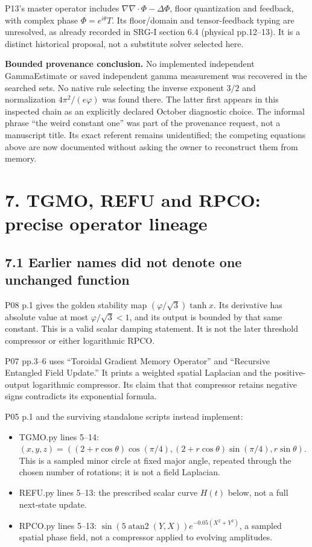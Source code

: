 \documentclass[11pt,a4paper]{article}
\begin{document}
P13's master operator includes $\nabla\nabla\cdot\Phi-\Delta\Phi$, floor quantization and feedback, with complex phase $\Phi=e^{i\theta}T$. Its floor/domain and tensor-feedback typing are unresolved, as already recorded in SRG-I section 6.4 (physical pp.12--13). It is a distinct historical proposal, not a substitute solver selected here.


\textbf{Bounded provenance conclusion.} No implemented independent GammaEstimate or saved independent gamma measurement was recovered in the searched sets. No native rule selecting the inverse exponent $3/2$ and normalization $4\pi^2/(e\varphi)$ was found there. The latter first appears in this inspected chain as an explicitly declared October diagnostic choice. The informal phrase ``the weird constant one'' was part of the provenance request, not a manuscript title. Its exact referent remains unidentified; the competing equations above are now documented without asking the owner to reconstruct them from memory.


\clearpage
\section*{7. TGMO, REFU and RPCO: precise operator lineage}

\subsection*{7.1 Earlier names did not denote one unchanged function}

P08 p.1 gives the golden stability map $(\varphi/\sqrt3)\tanh x$. Its derivative has absolute value at most $\varphi/\sqrt3<1$, and its output is bounded by that same constant. This is a valid scalar damping statement. It is not the later threshold compressor or either logarithmic RPCO.


P07 pp.3--6 uses ``Toroidal Gradient Memory Operator'' and ``Recursive Entangled Field Update.'' It prints a weighted spatial Laplacian and the positive-output logarithmic compressor. Its claim that that compressor retains negative signs contradicts its exponential formula.


P05 p.1 and the surviving standalone scripts instead implement:


\begin{itemize}
\item TGMO.py lines 5--14: $(x,y,z)=((2+r\cos\theta)\cos(\pi/4),(2+r\cos\theta)\sin(\pi/4),r\sin\theta)$. This is a sampled minor circle at fixed major angle, repeated through the chosen number of rotations; it is not a field Laplacian.
\item REFU.py lines 5--13: the prescribed scalar curve $H(t)$ below, not a full next-state update.
\item RPCO.py lines 5--13: $\sin(5\operatorname{atan2}(Y,X))e^{-0.05(X^2+Y^2)}$, a sampled spatial phase field, not a compressor applied to evolving amplitudes.
\end{itemize}
\end{document}
